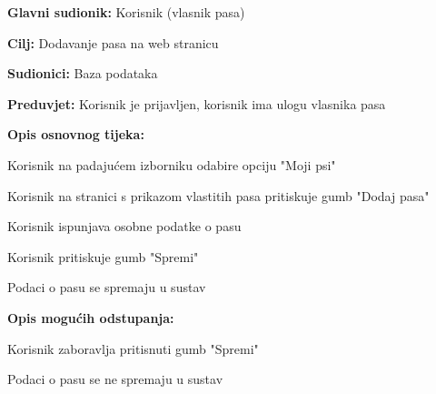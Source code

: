 					\noindent {}
					\begin{packed_item}
						
						\item \textbf{Glavni sudionik: } Korisnik (vlasnik pasa)
						\item  \textbf{Cilj:} Dodavanje pasa na web stranicu
						\item  \textbf{Sudionici:} Baza podataka 
						\item  \textbf{Preduvjet:} Korisnik je prijavljen, korisnik ima ulogu vlasnika pasa
						\item  \textbf{Opis osnovnog tijeka:}
						
						\item[] \begin{packed_enum}
							
							\item Korisnik na padajućem izborniku odabire opciju "Moji psi" 
							\item Korisnik na stranici s prikazom vlastitih pasa pritiskuje gumb "Dodaj pasa"
							\item Korisnik ispunjava osobne podatke o pasu
							\item Korisnik pritiskuje gumb "Spremi"
							\item Podaci o pasu se spremaju u sustav
							
						\end{packed_enum}
					
				
						\item  \textbf{Opis mogućih odstupanja:}
		
						\item[] \begin{packed_item}
	
							\item[4.a] Korisnik zaboravlja pritisnuti gumb "Spremi"
							\item[] \begin{packed_enum}
								\item Podaci o pasu se ne spremaju u sustav
							\end{packed_enum}
						\end{packed_item}
					\end{packed_item}
					
